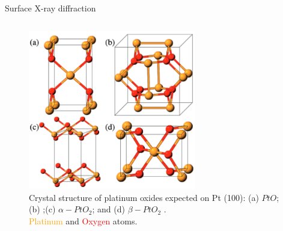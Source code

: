 \begin{frame}{Surface X-ray diffraction}
\begin{columns}
        \pause
        \begin{figure}
            \centering
            \includegraphics[width=0.65\textwidth]{Figures/sxrd_data/PtOxides.png}
            \caption{Crystal  structure  of  platinum  oxides expected on Pt (100): (a) $PtO$; (b) \ptthreeofour;(c) $\alpha-PtO_2$; and (d) $\beta-PtO_2$ \footnotemark{}.\\ \textcolor{orange}{Platinum} and \textcolor{red}{Oxygen} atoms.}
            \label{fig:PtOstructures}
        \end{figure}

    \end{columns}
    

\end{frame}